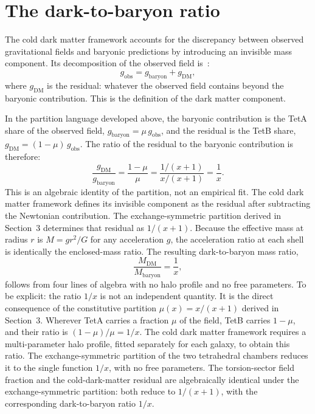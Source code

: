 \documentclass[twocolumn]{iopjournal}
\begin{document}

\section{The dark-to-baryon ratio}

The cold dark matter framework accounts for the discrepancy
between observed gravitational fields and baryonic predictions
by introducing an invisible mass component. Its decomposition of
the observed field is~\cite{NFW1996}:
\begin{equation}
  g_{\mathrm{obs}} = g_{\mathrm{baryon}} + g_{\mathrm{DM}},
  \label{eq:cdm_decomp}
\end{equation}
where $g_{\mathrm{DM}}$ is the residual: whatever the
observed field contains beyond the baryonic contribution. This
is the definition of the dark matter component.

In the partition language developed above, the baryonic
contribution is the TetA share of the observed field,
$g_{\mathrm{baryon}} = \mu\,g_{\mathrm{obs}}$, and the residual
is the TetB share,
$g_{\mathrm{DM}} = (1 - \mu)\,g_{\mathrm{obs}}$. The ratio of
the residual to the baryonic contribution is therefore:
\begin{equation}
  \frac{g_{\mathrm{DM}}}{g_{\mathrm{baryon}}}
  = \frac{1 - \mu}{\mu}
  = \frac{1/(x+1)}{x/(x+1)}
  = \frac{1}{x}.
  \label{eq:ratio}
\end{equation}
This is an algebraic identity of the partition, not an empirical
fit. The cold dark matter framework defines its invisible
component as the residual after subtracting the Newtonian
contribution. The exchange-symmetric partition derived in
Section~3 determines that residual as $1/(x+1)$. Because the
effective mass at radius $r$ is $M = gr^2/G$ for any
acceleration $g$, the acceleration ratio at each shell is
identically the enclosed-mass ratio. The resulting
dark-to-baryon mass ratio,
\begin{equation}
  \boxed{\frac{M_{\mathrm{DM}}}{M_{\mathrm{baryon}}} = \frac{1}{x},}
  \label{eq:dm_ratio}
\end{equation}
follows from four lines of algebra with no halo profile and no
free parameters. To be explicit: the ratio $1/x$ is not an
independent quantity. It is the direct consequence of the
constitutive partition $\mu(x) = x/(x+1)$ derived in Section~3.
Wherever TetA carries a fraction $\mu$ of the field, TetB
carries $1 - \mu$, and their ratio is $(1 - \mu)/\mu = 1/x$.
The cold dark matter framework requires a multi-parameter halo
profile, fitted separately for each galaxy, to obtain this
ratio. The exchange-symmetric partition of the two tetrahedral
chambers reduces it to the single function $1/x$, with no free
parameters. The torsion-sector field fraction and the
cold-dark-matter residual are algebraically identical under the
exchange-symmetric partition: both reduce to $1/(x{+}1)$, with
the corresponding dark-to-baryon ratio $1/x$.
\end{document}
